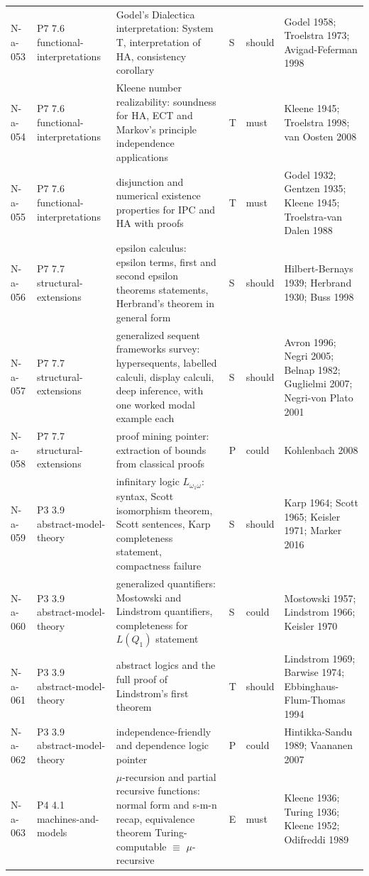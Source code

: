 \begin{longtable}{@{}p{0.52in}p{0.85in}p{2.5in}p{0.22in}p{0.42in}p{1.95in}@{}}
N-a-053 & P7 7.6 functional-interpretations & Godel's Dialectica interpretation: System T, interpretation of HA, consistency corollary & S & should & Godel 1958; Troelstra 1973; Avigad-Feferman 1998 \\
N-a-054 & P7 7.6 functional-interpretations & Kleene number realizability: soundness for HA, ECT and Markov's principle independence applications & T & must & Kleene 1945; Troelstra 1998; van Oosten 2008 \\
N-a-055 & P7 7.6 functional-interpretations & disjunction and numerical existence properties for IPC and HA with proofs & T & must & Godel 1932; Gentzen 1935; Kleene 1945; Troelstra-van Dalen 1988 \\
N-a-056 & P7 7.7 structural-extensions & epsilon calculus: epsilon terms, first and second epsilon theorems statements, Herbrand's theorem in general form & S & should & Hilbert-Bernays 1939; Herbrand 1930; Buss 1998 \\
N-a-057 & P7 7.7 structural-extensions & generalized sequent frameworks survey: hypersequents, labelled calculi, display calculi, deep inference, with one worked modal example each & S & should & Avron 1996; Negri 2005; Belnap 1982; Guglielmi 2007; Negri-von Plato 2001 \\
N-a-058 & P7 7.7 structural-extensions & proof mining pointer: extraction of bounds from classical proofs & P & could & Kohlenbach 2008 \\
N-a-059 & P3 3.9 abstract-model-theory & infinitary logic \(L_{\omega_1\omega}\): syntax, Scott isomorphism theorem, Scott sentences, Karp completeness statement, compactness failure & S & should & Karp 1964; Scott 1965; Keisler 1971; Marker 2016 \\
N-a-060 & P3 3.9 abstract-model-theory & generalized quantifiers: Mostowski and Lindstrom quantifiers, completeness for \(L(Q_1)\) statement & S & could & Mostowski 1957; Lindstrom 1966; Keisler 1970 \\
N-a-061 & P3 3.9 abstract-model-theory & abstract logics and the full proof of Lindstrom's first theorem & T & should & Lindstrom 1969; Barwise 1974; Ebbinghaus-Flum-Thomas 1994 \\
N-a-062 & P3 3.9 abstract-model-theory & independence-friendly and dependence logic pointer & P & could & Hintikka-Sandu 1989; Vaananen 2007 \\
N-a-063 & P4 4.1 machines-and-models & \(\mu\)-recursion and partial recursive functions: normal form and s-m-n recap, equivalence theorem Turing-computable \(\equiv\) \(\mu\)-recursive & E & must & Kleene 1936; Turing 1936; Kleene 1952; Odifreddi 1989 \\

\end{longtable}
